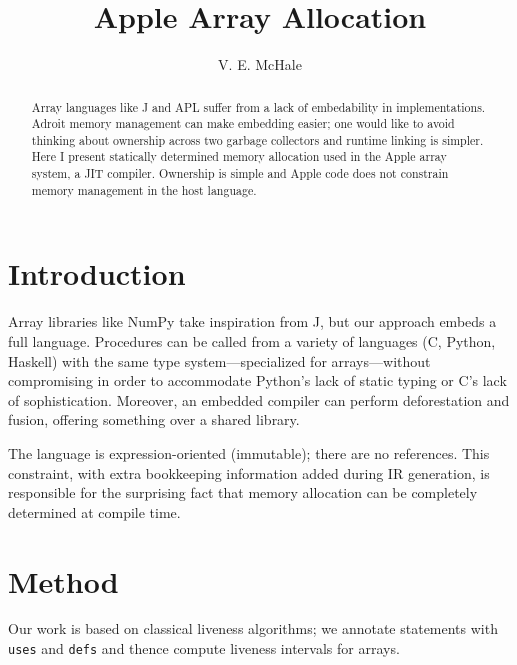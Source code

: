 \documentclass{article}
\begin{document}
\title{Apple Array Allocation}
\author{V. E. McHale}
\maketitle

\begin{abstract}
    Array languages like J and APL suffer from a lack of embedability in implementations. Adroit memory management can make embedding easier; one would like to avoid thinking about ownership across two garbage collectors and runtime linking is simpler. Here I present statically determined memory allocation used in the Apple array system, a JIT compiler. Ownership is simple and Apple code does not constrain memory management in the host language.
\end{abstract}

\section{Introduction}

Array libraries like NumPy take inspiration from J, but our approach embeds a full language. Procedures can be called from a variety of languages (C, Python, Haskell) with the same type system---specialized for arrays---without compromising in order to accommodate Python's lack of static typing or C's lack of sophistication. Moreover, an embedded compiler can perform deforestation and fusion, offering something over a shared library.


The language is expression-oriented (immutable); there are no references. This constraint, with extra bookkeeping information added during IR generation, is responsible for the surprising fact that memory allocation can be completely determined at compile time.

\section{Method}

Our work is based on classical liveness algorithms; we annotate statements with {\tt uses} and {\tt defs} and thence compute liveness intervals for arrays.

\end{document}
